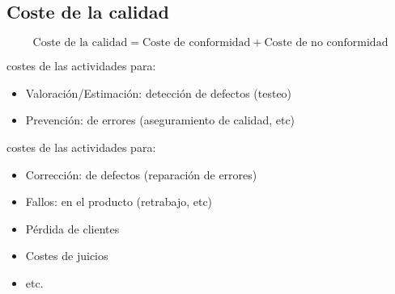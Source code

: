
\subsection{Coste de la calidad}
\begin{equation}
   \text{Coste de la calidad} = \text{Coste de conformidad} + \text{Coste de no conformidad}
\end{equation}

\begin{definition}
	costes de las actividades para:
	\begin{itemize}
		\item Valoración/Estimación: detección de defectos (testeo)
		\item Prevención: de errores (aseguramiento de calidad, etc)
	\end{itemize}
\end{definition}


\begin{definition}
   costes de las actividades para:
   \begin{itemize}
      \item Corrección: de defectos (reparación de errores)
      \item Fallos: en el producto (retrabajo, etc)
      \item Pérdida de clientes
      \item Costes de juicios
      \item etc.
   \end{itemize}
\end{definition}

